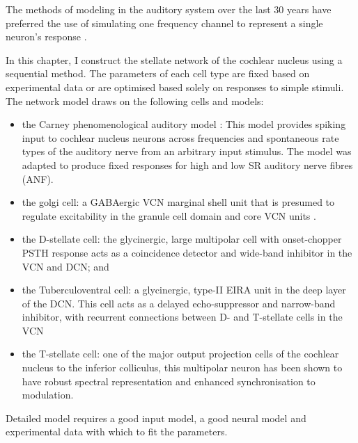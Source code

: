 \medskip{} 

The methods of
modeling in the auditory system over the last 30 years have preferred
the use of simulating one frequency channel to represent a single
neuron's response \citep{DavisVoigt:1991,Carney:1993}. 

\medskip{}

In this chapter, I construct the stellate network of the cochlear
nucleus using a sequential method.  The parameters of each cell type
are fixed based on experimental data or are optimised based solely on
responses to simple stimuli. The network model draws on the following
cells and models:
\begin{itemize}
\item the Carney phenomenological auditory model
  \citet{ZilanyBruceEtAl:2009}:  This model provides spiking input to
  cochlear nucleus neurons across frequencies and spontaneous rate
  types of the auditory nerve from an arbitrary input stimulus.  The
  model was adapted to produce fixed responses for high and low SR
  auditory nerve fibres (ANF).
\item the golgi cell: a GABAergic VCN marginal shell unit that is
  presumed to regulate excitability in the granule cell domain and
  core VCN units \citep{FerragamoGoldingEtAl:1998}.
\item the D-stellate cell: the glycinergic, large multipolar cell with
  onset-chopper PSTH response acts as a co\-incidence detector and
  wide-band inhibitor in the VCN and DCN; and
\item the Tuberculo\-ventral cell: a glycinergic, type-II EIRA unit in
  the deep layer of the DCN.  This cell acts as a delayed
  echo-suppressor and narrow-band inhibitor, with recurrent
  connections between D- and T-stellate cells in the VCN
\item the T-stellate cell: one of the major output projection cells of
  the cochlear nucleus to the inferior colliculus, this multipolar
  neuron has been shown to have robust spectral representation and
  enhanced synchronisation to modulation.
\end{itemize}

\medskip{}

Detailed model requires a good input model, a good neural
  model and experimental data with which to fit the parameters. 


